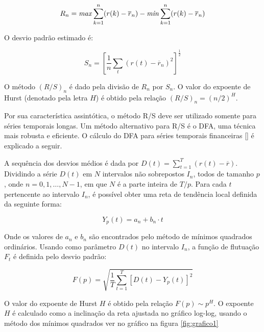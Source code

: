 \documentclass[brazil,ruledheader]{abnt}
\renewcommand{\cite}[1]{[\citeonline{#1}]}
\begin{document}
\begin{equation}
\label{eq:amplitude-desvio}
R_n = \mbox{\emph{max}}\sum_{k=1}^n
(r(k)-\overline{r}_n)-\mbox{\emph{min}}\sum_{k=1}^n (r(k)-\overline{r}_n)
\end{equation}

O desvio padrão estimado é:

\begin{equation}
\label{eq:desvio-padrao-estimado}
S_n = \left[ \frac{1}{n}\sum_t (r(t)-\overline{r}_n)^2 \right]^{\frac{1}{2}}
\end{equation}

O método $(R/S)_n$ é dado pela divisão de $R_n$ por $S_n$. O valor do expoente
de Hurst (denotado pela letra $H$) é obtido pela relação $(R/S)_n=(n/2)^H$.

Por sua característica assintótica, o método R/S deve ser utilizado somente para
séries temporais longas. Um método alternativo para R/S é o DFA, uma técnica
mais robusta e eficiente. O cálculo do DFA para séries temporais financeiras
\cite{CoVa03} é explicado a seguir.

A sequência dos desvios médios é dada por
$D(t)=\sum_{t=1}^T(r(t)-\overline{r})$. Dividindo a série $D(t)$ em $N$
intervalos não sobrepostos $I_n$, todos de tamanho $p$, onde $n=0,1,\dots,N-1$,
em que $N$ é a parte inteira de $T/p$. Para cada $t$ pertencente ao intervalo
$I_n$, é possível obter uma reta de tendência local definida da seguinte forma:

\begin{equation}
\label{eq:reta-tendencia-local}
Y_p(t)=a_n+b_n\cdot t
\end{equation}

Onde os valores de $a_n$ e $b_n$ são encontrados pelo método de mínimos
quadrados ordinários. Usando como parâmetro $D(t)$ no intervalo $I_n$, a função
de flutuação $F_t$ é definida pelo desvio padrão:

\begin{equation}
\label{eq:desvio-padrao-flutuacao}
F(p)=\sqrt{\frac{1}{T}\sum_{t=1}^T [D(t)-Y_p(t)]^2}
\end{equation}

O valor do expoente de Hurst $H$ é obtido pela relação $F(p)\sim p^H$. O
expoente $H$ é calculado como a inclinação da reta ajustada no gráfico log-log,
usando o método dos mínimos quadrados ver no gráfico na figura
\ref{fig:grafico1}
\end{document}
